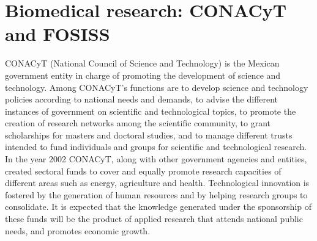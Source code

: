 \documentclass[11pt]{article}
\begin{document}





\section{Biomedical research: CONACyT and FOSISS}
\label{sec:1}

CONACyT (National Council of Science and Technology) is the Mexican government
entity in charge of promoting the development of science and 
technology.
Among CONACyT's functions are to develop science and technology
policies according to national needs and demands, to advise the different
instances of government on scientific and technological topics, to promote the
creation of research networks among the scientific community, to grant
scholarships for masters and doctoral studies, and to manage different trusts 
intended to fund individuals and groups for scientific and
technological research.\\

In the year 2002 CONACyT, along with other government agencies and
entities, created sectoral funds
to cover and equally
promote research capacities of different areas such as energy, agriculture
and health. Technological innovation is fostered by the generation of human resources
and by helping research groups to consolidate. It is expected that the
knowledge generated under the sponsorship of these funds
will be the product of applied research that attends national public
needs, and promotes economic growth.\\
\end{document}
